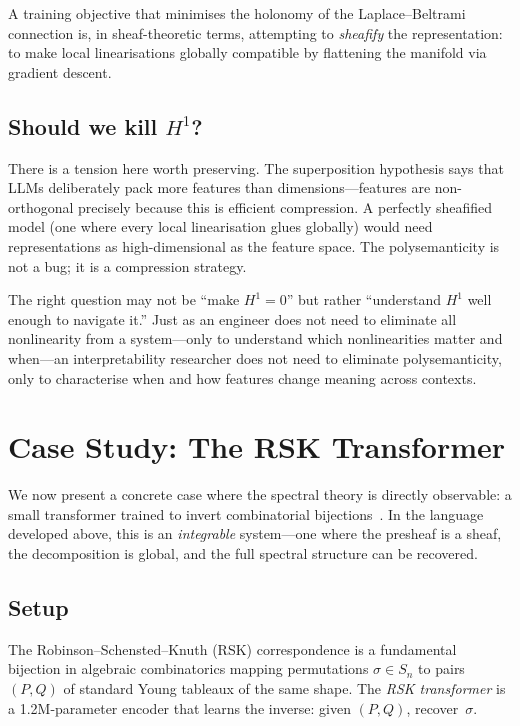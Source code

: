 \documentclass[11pt,a4paper]{article}
\begin{document}
A training objective that minimises the holonomy of the Laplace--Beltrami
connection is, in sheaf-theoretic terms, attempting to \emph{sheafify} the
representation: to make local linearisations globally compatible by flattening
the manifold via gradient descent.

\subsection{Should we kill $H^1$?}

There is a tension here worth preserving. The superposition hypothesis says that
LLMs deliberately pack more features than dimensions---features are
non-orthogonal precisely because this is efficient compression. A perfectly
sheafified model (one where every local linearisation glues globally) would need
representations as high-dimensional as the feature space. The polysemanticity
is not a bug; it is a compression strategy.

The right question may not be ``make $H^1 = 0$'' but rather ``understand $H^1$
well enough to navigate it.'' Just as an engineer does not need to eliminate
all nonlinearity from a system---only to understand which nonlinearities matter
and when---an interpretability researcher does not need to eliminate
polysemanticity, only to characterise when and how features change meaning
across contexts.

\section{Case Study: The RSK Transformer}

We now present a concrete case where the spectral theory is directly observable:
a small transformer trained to invert combinatorial bijections~\cite{rsk-transformer}.
In the language developed above, this is an \emph{integrable} system---one where
the presheaf is a sheaf, the decomposition is global, and the full spectral
structure can be recovered.

\subsection{Setup}

The Robinson--Schensted--Knuth (RSK) correspondence is a fundamental bijection
in algebraic combinatorics mapping permutations $\sigma \in S_n$ to pairs
$(P, Q)$ of standard Young tableaux of the same shape. The \emph{RSK transformer}
is a 1.2M-parameter encoder that learns the inverse: given $(P, Q)$,
recover~$\sigma$.
\end{document}
